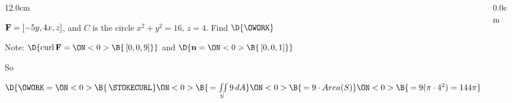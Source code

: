 \begin{frame}
\begin{columns}\begin{column}{12.0cm}
\scriptsize

\EX ${\bf F} = [-5y,4x,z]$, and $C$ is the circle $x^2 + y^2 = 16$, $z=4$. \quad Find $\D{\OWORK}$

\vspace{0.4cm}

Note:
$\D{
\text{curl}\, {\bf F} =
\ON<0>{\B{\, [0,0,9]}}}$ \quad and $\D{{\bf n} = 
\ON<0>{\B{\,[0,0,1]}}}$

\vspace{0.4cm}

So 

\vspace{0.4cm}

$\D{\OWORK = 
\ON<0>{\B{\,\STOKECURL}}
\ON<0>{\B{\, = \iint \limits_{S} 9\, dA}}
\ON<0>{\B{\, = 9 \cdot Area(S)}}
\ON<0>{\B{\, = 9 (\pi \cdot 4^2) = 144 \pi}}}$

\vspace{9.2cm}

\end{column}\begin{column}{0.0cm}\end{column}\end{columns}
\end{frame}

